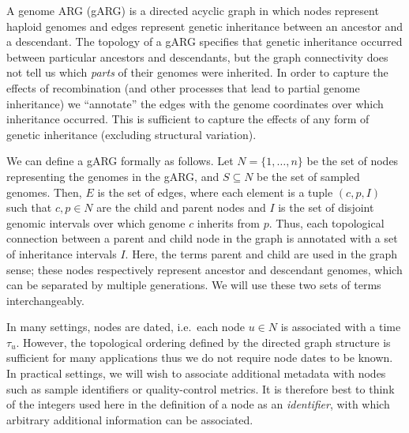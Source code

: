 \documentclass{article}
\begin{document}
A genome ARG (gARG) is a directed acyclic graph in which nodes represent
haploid genomes and edges represent
genetic inheritance between an ancestor and a descendant.
The topology of a gARG specifies that genetic inheritance
occurred between particular
ancestors and descendants, but the graph connectivity
does not tell us which \emph{parts} of their genomes were inherited.
In order to capture the effects of recombination
(and other processes that lead to partial genome inheritance)
 we ``annotate'' the edges with the genome
coordinates over which inheritance occurred.
This is sufficient to capture the effects of any form of
genetic inheritance (excluding structural variation).

We can define a gARG formally as follows.
Let $N = \{1, \dots, n\}$ be the set of nodes representing
the genomes in the gARG,
and  $S \subseteq N$ be the set of sampled genomes.
Then, $E$ is the set of edges, where each element
is a tuple $(c, p, I)$ such that $c, p \in N$ are the child and
parent nodes and $I$ is the set of disjoint genomic intervals
over which genome $c$ inherits from $p$.
Thus, each topological connection between
a parent and child node in the graph is annotated with a set of
inheritance intervals $I$.
Here, the terms parent and child are used in the graph sense;
these nodes respectively represent ancestor and descendant genomes,
which can be separated by multiple generations.
We will use these two sets of terms interchangeably.

In many settings, nodes are dated, i.e.\ each
node $u\in N$ is associated with a time $\tau_u$.
However, the topological ordering
defined by the directed graph structure
 is sufficient for many applications
thus we do not require node dates to be known.
In practical settings, we will wish to associate additional
metadata with nodes such as sample identifiers or quality-control metrics.
It is therefore best to think of the
integers used here in the definition of a node as an \emph{identifier},
with which arbitrary additional information can be associated.
\end{document}
